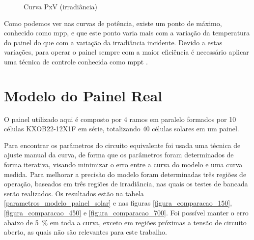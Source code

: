 \begin{figure}[!htpb]
\begin{minipage}{.5\textwidth}
\begin{center}
\caption{Curva PxV (irradiância)}
\label{figura_potência_painel_irradiância}
\end{center}
\end{minipage}
\end{figure}

Como podemos ver nas curvas de potência, existe um ponto de máximo, conhecido como \gls{mpp}, e que este ponto varia mais com a variação da temperatura do painel do que com a variação da irradiância incidente. Devido a estas variações, para operar o painel sempre com a maior eficiência é necessário aplicar uma técnica de controle conhecida como \gls{mppt} \cite{ahmed2016}.

\section{Modelo do Painel Real}

O painel utilizado aqui é composto por 4 ramos em paralelo formados por 10 células KXOB22-12X1F em série, totalizando 40 células solares em um painel.

Para encontrar os parâmetros do circuito equivalente foi usada uma técnica de ajuste manual da curva, de forma que os parâmetros foram determinados de forma iterativa, visando minimizar o erro entre a curva do modelo e uma curva medida. Para melhorar a precisão do modelo foram determinadas três regiões de operação, baseados em três regiões de irradiância, nas quais os testes de bancada serão realizados. Os resultados estão na tabela \ref{parametros_modelo_painel_solar} e nas figuras \ref{figura_comparacao_150}, \ref{figura_comparacao_450} e \ref{figura_comparacao_700}. Foi possível manter o erro abaixo de \SI{5}{\percent} em toda a curva, exceto em regiões próximas a tensão de circuito aberto, as quais não são relevantes para este trabalho.

